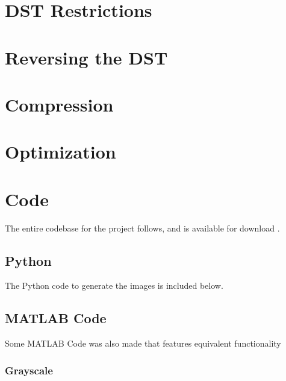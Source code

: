 \documentclass[10pt]{report}
\begin{document}
\section{DST Restrictions}

\section{Reversing the DST}

\section{Compression}

\section{Optimization}

\newpage

\appendix

\section{Code}

The entire codebase for the project follows, and is available for download .

    \subsection{Python}

    The Python code to generate the images is included below.

        

    \newpage

    \subsection{MATLAB Code}

    Some MATLAB Code was also made that features equivalent functionality

        \subsubsection{Grayscale}
\end{document}
